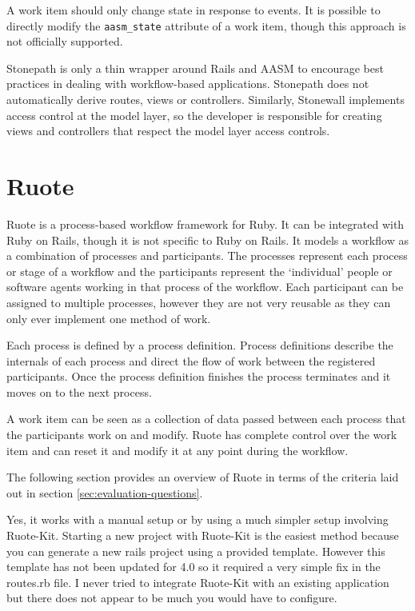 \documentclass[document.tex]{subfiles}
\begin{document}

A work item should only change state in response to events. It is possible to directly modify the \verb!aasm_state! attribute of a work item, though this approach is not officially supported.


Stonepath is only a thin wrapper around Rails and AASM to encourage best practices in dealing with workflow-based applications. Stonepath does not automatically derive routes, views or controllers. Similarly, Stonewall implements access control at the model layer, so the developer is responsible for creating views and controllers that respect the model layer access controls.


\section {Ruote}
Ruote is a process-based workflow framework for Ruby. It can be integrated with Ruby on Rails, though it is not specific to Ruby on Rails. It models a workflow as a combination of processes and participants. The processes represent each process or stage of a workflow and the participants represent the ‘individual' people or software agents working in that process of the workflow. Each participant can be assigned to multiple processes, however they are not very reusable as they can only ever implement one method of work.

Each process is defined by a process definition. Process definitions describe the internals of each process and direct the flow of work between the registered participants. Once the process definition finishes the process terminates and it moves on to the next process.

A work item can be seen as a collection of data passed between each process that the participants work on and modify. Ruote has complete control over the work item and can reset it and modify it at any point during the workflow.

The following section provides an overview of Ruote in terms of the criteria laid out in section \ref{sec:evaluation-questions}.


Yes, it works with a manual setup or by using a much simpler setup involving Ruote-Kit. Starting a new project with Ruote-Kit is the easiest method because you can generate a new rails project using a provided template. However this template has not been updated for 4.0 so it required a very simple fix in the routes.rb file. I never tried to integrate Ruote-Kit with an existing application but there does not appear to be much you would have to configure.
\end{document}
